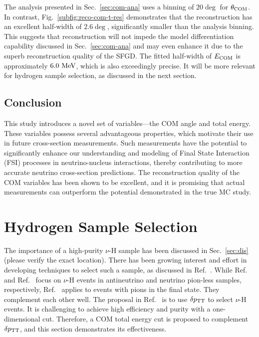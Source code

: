      The analysis presented in Sec.~\ref{sec:com-ana} uses a binning of $20\deg$ for $\theta_{\textrm{COM}}$. In contrast, Fig.~\ref{subfig:reco-com-t-res} demonstrates that the reconstruction has an excellent half-width of $2.6\deg$, significantly smaller than the analysis binning. This suggests that reconstruction will not impede the model differentiation capability discussed in Sec.~\ref{sec:com-ana} and may even enhance it due to the superb reconstruction quality of the SFGD. The fitted half-width of $E_{\textrm{COM}}$ is approximately $6.0~\textrm{MeV}$, which is also exceedingly precise. It will be more relevant for hydrogen sample selection, as discussed in the next section. 

     \subsection{Conclusion}
     This study introduces a novel set of variables—the COM angle and total energy. These variables possess several advantageous properties, which motivate their use in future cross-section measurements. Such measurements have the potential to significantly enhance our understanding and modeling of Final State Interaction (FSI) processes in neutrino-nucleus interactions, thereby contributing to more accurate neutrino cross-section predictions. The reconstruction quality of the COM variables has been shown to be excellent, and it is promising that actual measurements can outperform the potential demonstrated in the true MC study.

\section{Hydrogen Sample Selection}
\label{sec:mc-hydrogen}
The importance of a high-purity $\nu$-H sample has been discussed in Sec.~\ref{sec:dis} (please verify the exact location).
There has been growing interest and effort in developing techniques to select such a sample, as discussed in Ref.~\cite{Lu:2015hea,MINERvA:2023avz,Baudis:2023tma}.
While Ref.~\cite{MINERvA:2023avz} and Ref.~\cite{Baudis:2023tma} focus on $\nu$-H events in antineutrino and neutrino pion-less samples, respectively, Ref.~\cite{Lu:2015hea} applies to events with pions in the final state. 
They complement each other well.
The proposal in Ref.~\cite{Lu:2015hea} is to use $\delta p_\textrm{TT}$ to select $\nu$-H events.
It is challenging to achieve high efficiency and purity with a one-dimensional cut. 
Therefore, a COM total energy cut is proposed to complement $\delta p_\textrm{TT}$, and this section demonstrates its effectiveness.

